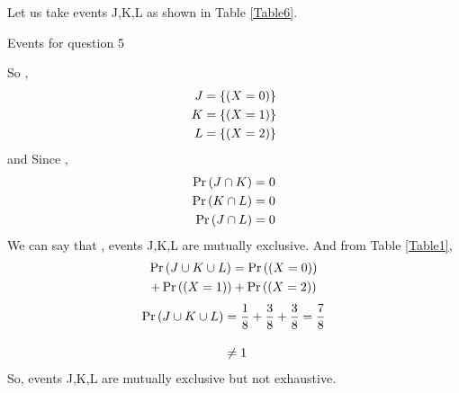 \documentclass[journal,12pt,twocolumn]{IEEEtran}
\begin{document}
\begin{enumerate}[label=(\roman*)]
    Let us take events J,K,L as shown in Table \ref{Table6}.
    \begin{table}[ht!]
        
        \caption{Events for question 5}
        \label{Table6}
    \end{table}
    So ,
    \begin{align}
        J &= \left\{ (X=0) \right\} \\
        K &= \left\{ (X=1) \right\} \\
        L &= \left\{ (X=2) \right\}
    \end{align}
    and Since , 
    \begin{align}
        \Pr\left(J \cap K\right) &= 0 \\
        \Pr\left(K \cap L\right) &= 0 \\
        \Pr\left(J \cap L\right) &= 0
    \end{align}
    We can say that , events J,K,L are mutually exclusive. And from Table \ref{Table1},
    \begin{multline}
        \Pr\left(J \cup K \cup L\right) = \Pr\left((X=0)\right) \\
        + \Pr\left((X=1)\right) + \Pr\left((X=2)\right) 
    \end{multline}
    \begin{align}
        \Pr\left(J \cup K \cup L\right) &= \dfrac{1}{8} + \dfrac{3}{8} + \dfrac{3}{8} = \dfrac{7}{8}\\[10pt]
                             &\neq 1 
    \end{align}  
    So, events J,K,L are mutually exclusive but not exhaustive.
    
\end{enumerate}
\end{document}
